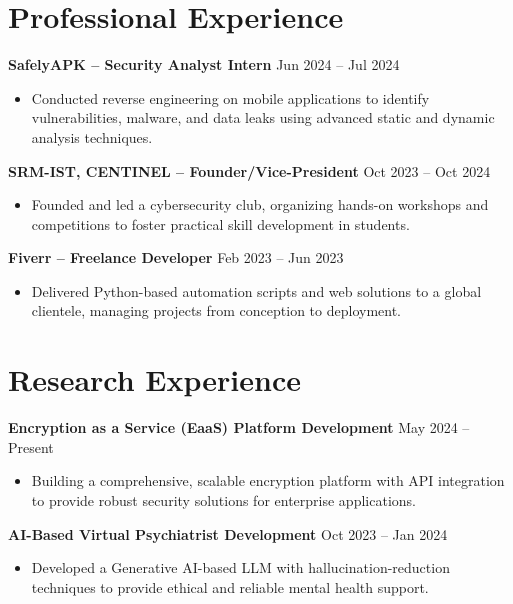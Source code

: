 \documentclass[10pt,a4paper]{article}
\begin{document}
\begin{minipage}[t]{0.65\textwidth}
    \section{Professional Experience}
    \textbf{SafelyAPK -- Security Analyst Intern} \hfill Jun 2024 – Jul 2024
    \begin{itemize}
        \item Conducted reverse engineering on mobile applications to identify vulnerabilities, malware, and data leaks using advanced static and dynamic analysis techniques.
    \end{itemize}
    
    \textbf{SRM-IST, CENTINEL -- Founder/Vice-President} \hfill Oct 2023 – Oct 2024
    \begin{itemize}
        \item Founded and led a cybersecurity club, organizing hands-on workshops and competitions to foster practical skill development in students.
    \end{itemize}
    
    \textbf{Fiverr -- Freelance Developer} \hfill Feb 2023 – Jun 2023
    \begin{itemize}
        \item Delivered Python-based automation scripts and web solutions to a global clientele, managing projects from conception to deployment.
    \end{itemize}

    \section{Research Experience}
    \textbf{Encryption as a Service (EaaS) Platform Development} \hfill May 2024 – Present
    \begin{itemize}
        \item Building a comprehensive, scalable encryption platform with API integration to provide robust security solutions for enterprise applications.
    \end{itemize}
    
    \textbf{AI-Based Virtual Psychiatrist Development} \hfill Oct 2023 – Jan 2024
    \begin{itemize}
        \item Developed a Generative AI-based LLM with hallucination-reduction techniques to provide ethical and reliable mental health support.
    \end{itemize}

\end{minipage}
\end{document}
